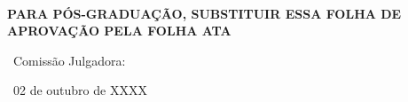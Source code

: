 %
\begin{folhadeaprovacao}
  \begin{center}
       {\ABNTEXchapterfont\normalfont\imprimirautor}\\
\textbf{PARA PÓS-GRADUAÇÃO, SUBSTITUIR ESSA  FOLHA DE APROVAÇÃO  PELA FOLHA ATA}
	 \vspace*{2cm}
   
    \begin{center}
      \ABNTEXchapterfont\bfseries\MakeUppercase\imprimirtitulo

    \end{center}
		\vspace*{3cm}
		\hspace{.45\textwidth}
    \begin{minipage}{.5\textwidth}
        \imprimirpreambulo
    \end{minipage}
		\vspace*{2cm}
	\end{center}

  \begin{center}
		
	  {\ABNTEXchapterfont\normalfont\ {Comiss\~ao Julgadora:} \\}
		

		
		
		\vspace*{4cm}
   	{\ABNTEXchapterfont\normalfont\imprimirlocal}
    \par
  {\ABNTEXchapterfont\normalfont\ {02 de outubro de XXXX} \\}
\end{center}
\end{folhadeaprovacao}
